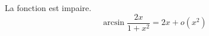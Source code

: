 La fonction est impaire.
\begin{displaymath}
  \arcsin\frac{2x}{1+x^2} = 2x + o(x^2)
\end{displaymath}

